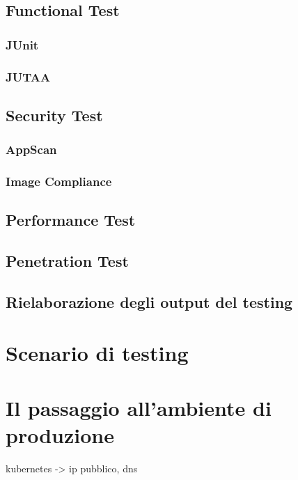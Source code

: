 \subsection{Functional Test}
\subsubsection{JUnit}
\subsubsection{JUTAA}
\subsection{Security Test}
\subsubsection{AppScan}
\subsubsection{Image Compliance}
\subsection{Performance Test}
\subsection{Penetration Test}
\subsection{Rielaborazione degli output del testing}

\section{Scenario di testing}

\section{Il passaggio all'ambiente di produzione}
kubernetes -> ip pubblico, dns


